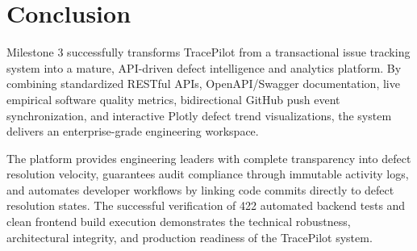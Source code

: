 \documentclass[11pt,a4paper]{article}
\begin{document}
\section{Conclusion}
Milestone 3 successfully transforms TracePilot from a transactional issue tracking system into a mature, API-driven defect intelligence and analytics platform. By combining standardized RESTful APIs, OpenAPI/Swagger documentation, live empirical software quality metrics, bidirectional GitHub push event synchronization, and interactive Plotly defect trend visualizations, the system delivers an enterprise-grade engineering workspace.

The platform provides engineering leaders with complete transparency into defect resolution velocity, guarantees audit compliance through immutable activity logs, and automates developer workflows by linking code commits directly to defect resolution states. The successful verification of 422 automated backend tests and clean frontend build execution demonstrates the technical robustness, architectural integrity, and production readiness of the TracePilot system.

\end{document}
